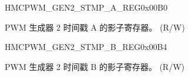 \begin{register}{H}{MCPWM\_GEN2\_STMP\_A\_REG}{0x00B0}\label{regdesc:MCPWMGEN2STMPAREG}
%
%
\regnewline%
\begin{regdesc}\begin{reglist}
\label{fielddesc:MCPWMGEN2A}\item [MCPWM\_GEN2\_A] PWM 生成器 2 时间戳 A 的影子寄存器。 (R/W)
\end{reglist}\end{regdesc}
\end{register}


\begin{register}{H}{MCPWM\_GEN2\_STMP\_B\_REG}{0x00B4}\label{regdesc:MCPWMGEN2STMPBREG}
%
%
\regnewline%
\begin{regdesc}\begin{reglist}
\label{fielddesc:MCPWMGEN2B}\item [MCPWM\_GEN2\_B] PWM 生成器 2 时间戳 B 的影子寄存器。 (R/W)
\end{reglist}\end{regdesc}
\end{register}


